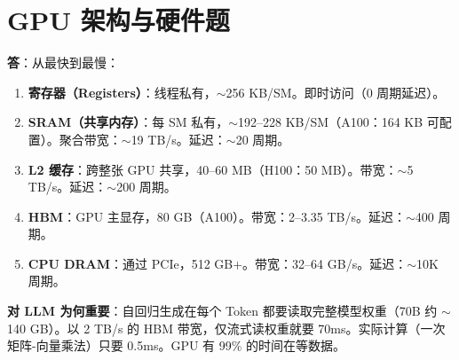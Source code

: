 \section{GPU 架构与硬件题}
\label{gpu-architecture-and-hardware-questions}

\begin{questionbox}
\textbf{答}：从最快到最慢：

\begin{enumerate}
  \item \textbf{寄存器（Registers）}：线程私有，$\sim$256 KB/SM。即时访问（0 周期延迟）。
  \item \textbf{SRAM（共享内存）}：每 SM 私有，$\sim$192--228 KB/SM（A100：164 KB 可配置）。聚合带宽：$\sim$19 TB/s。延迟：$\sim$20 周期。
  \item \textbf{L2 缓存}：跨整张 GPU 共享，40--60 MB（H100：50 MB）。带宽：$\sim$5 TB/s。延迟：$\sim$200 周期。
  \item \textbf{HBM}：GPU 主显存，80 GB（A100）。带宽：2--3.35 TB/s。延迟：$\sim$400 周期。
  \item \textbf{CPU DRAM}：通过 PCIe，512 GB+。带宽：32--64 GB/s。延迟：$\sim$10K 周期。
\end{enumerate}

\textbf{对 LLM 为何重要}：自回归生成在每个 Token 都要读取完整模型权重（70B 约 $\sim$140 GB）。以 2 TB/s 的 HBM 带宽，仅流式读权重就要 70ms。实际计算（一次矩阵-向量乘法）只要 0.5ms。GPU 有 99\% 的时间在等数据。


\end{questionbox}

